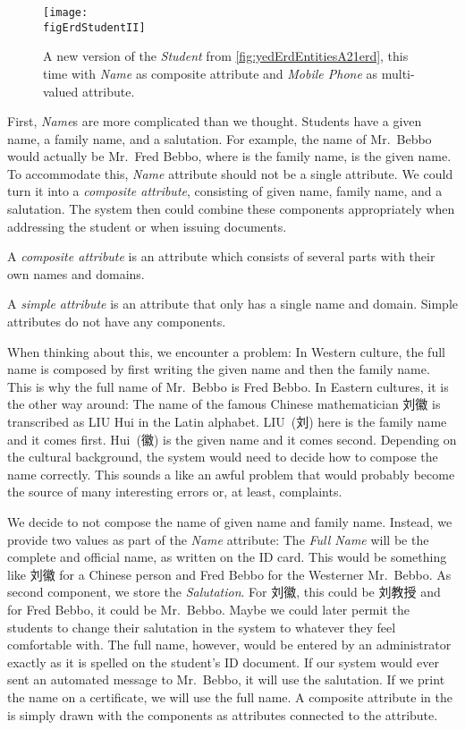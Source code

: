 \begin{figure}%
\centering%
\xdef\figErdStudentII{\currentDir/erdStudent2}%
\texttt{[image: \\figErdStudentII]}%
\caption{A new version of the \emph{Student}  from \cref{fig:yedErdEntitiesA21erd}, this time with \emph{Name} as composite attribute and \emph{Mobile Phone} as multi-valued attribute.}%
\label{fig:erdStudent2}%
\end{figure}%
%
First, \emph{Name}s are more complicated than we thought.
Students have a given name, a family name, and a salutation.
For example, the name of Mr.~Bebbo would actually be Mr.~Fred Bebbo, where  is the family name,  is the given name.
To accommodate this, \emph{Name} attribute should not be a single attribute.
We could turn it into a \emph{composite attribute}, consisting of given name, family name, and a salutation.
The system then could combine these components appropriately when addressing the student or when issuing documents.%
%
\begin{definition}%
A \emph{composite attribute} is an attribute which consists of several parts with their own names and domains.%
\end{definition}%
\begin{definition}%
A \emph{simple attribute} is an attribute that only has a single name and domain. %
Simple attributes do not have any components.%
\end{definition}%
%
%
When thinking about this, we encounter a problem:
In Western culture, the full name is composed by first writing the given name and then the family name.
This is why the full name of Mr.~Bebbo is Fred Bebbo.
In Eastern cultures, it is the other way around:
The name of the famous Chinese mathematician 刘徽 is transcribed as LIU Hui in the Latin alphabet.
LIU~(刘) here is the family name and it comes first.
Hui~(徽) is the given name and it comes second.
Depending on the cultural background, the system would need to decide how to compose the name correctly.
This sounds a like an awful problem that would probably become the source of many interesting errors or, at least, complaints.

We decide to not compose the name of given name and family name.
Instead, we provide two values as part of the \emph{Name} attribute:
The \emph{Full Name} will be the complete and official name, as written on the ID card.
This would be something like 刘徽 for a Chinese person and Fred Bebbo for the Westerner Mr.~Bebbo.
As second component, we store the \emph{Salutation}.
For 刘徽, this could be 刘教授 and for Fred Bebbo, it could be Mr.~Bebbo.
Maybe we could later permit the students to change their salutation in the system to whatever they feel comfortable with.
The full name, however, would be entered by an administrator exactly as it is spelled on the student's ID document.
If our system would ever sent an automated message to Mr.~Bebbo, it will use the salutation.
If we print the name on a certificate, we will use the full name.
A composite attribute in the  is simply drawn with the components as attributes connected to the attribute.

